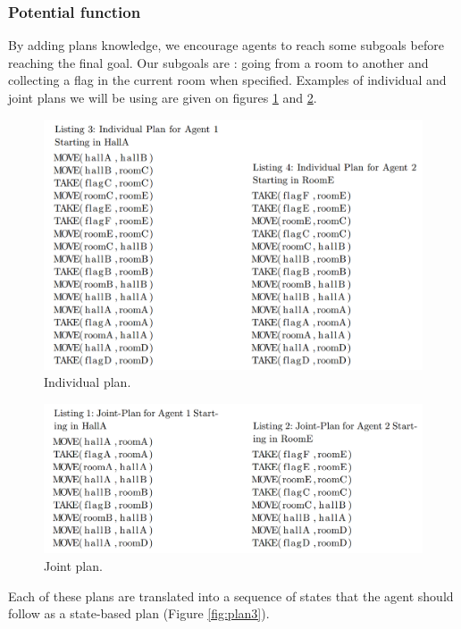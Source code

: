 \documentclass[letterpaper]{article}
\begin{document}
\subsubsection{Potential function} 
By adding plans knowledge, we encourage agents to reach some subgoals before reaching the final goal. Our subgoals are : going from a room to another and collecting a flag in the current room when specified. Examples of individual and joint plans we will be using are given on figures \ref{fig:plan1} and \ref{fig:plan2}.

\begin{figure}[h!]
\centering
  \includegraphics[width=1\linewidth]{img/individualPlan.png}
  \caption{Individual plan.}
  \label{fig:plan1}
\end{figure}

\begin{figure}[h!]
\centering
  \includegraphics[width=1\linewidth]{img/joinPlan.png}
  \caption{Joint plan.}
  \label{fig:plan2}
\end{figure}

Each of these plans are translated into a sequence of states that the agent should follow as a state-based plan (Figure \ref{fig:plan3}). 
\end{document}
